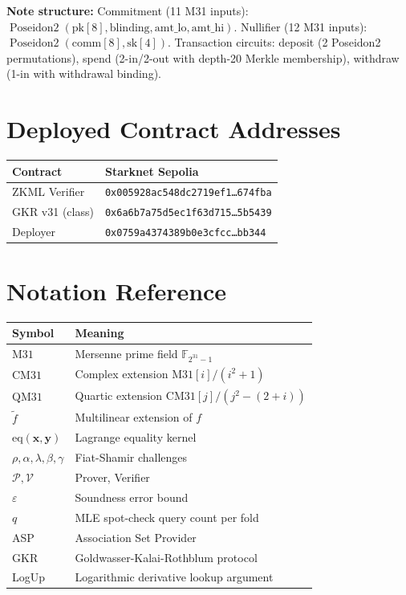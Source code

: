\documentclass[10pt,twocolumn]{article}
\theoremstyle{definition}
\theoremstyle{remark}
\newcommand{\F}{\mathbb{F}}
\newcommand{\M}{\mathrm{M31}}
\newcommand{\CM}{\mathrm{CM31}}
\newcommand{\QM}{\mathrm{QM31}}
\newcommand{\eq}{\mathrm{eq}}
\newcommand{\MLE}{\widetilde}
\newcommand{\calP}{\mathcal{P}}
\newcommand{\calV}{\mathcal{V}}
\DeclareMathOperator{\prhash}{Poseidon2}
\begin{document}
\textbf{Note structure:}
Commitment (11 M31 inputs): $\prhash(\text{pk}[8], \text{blinding},
\text{amt\_lo}, \text{amt\_hi})$.
Nullifier (12 M31 inputs): $\prhash(\text{comm}[8], \text{sk}[4])$.
Transaction circuits: deposit (2 Poseidon2 permutations),
spend (2-in/2-out with depth-20 Merkle membership),
withdraw (1-in with withdrawal binding).

\section{Deployed Contract Addresses}\label{app:contracts}

\begin{table}[h]
  \centering\small
  \begin{tabularx}{\columnwidth}{@{}lX@{}}
    \toprule
    \textbf{Contract} & \textbf{Starknet Sepolia} \\
    \midrule
    ZKML Verifier    & \texttt{0x005928ac548dc2719ef1\ldots 674fba} \\
    GKR v31 (class)  & \texttt{0x6a6b7a75d5ec1f63d715\ldots 5b5439} \\
    Deployer         & \texttt{0x0759a4374389b0e3cfcc\ldots bb344} \\
    \bottomrule
  \end{tabularx}
\end{table}

\section{Notation Reference}\label{app:notation}

\begin{table}[h]
  \centering\small
  \begin{tabularx}{\columnwidth}{@{}lX@{}}
    \toprule
    \textbf{Symbol} & \textbf{Meaning} \\
    \midrule
    $\M$   & Mersenne prime field $\F_{2^{31}-1}$ \\
    $\CM$  & Complex extension $\M[i]/(i^2+1)$ \\
    $\QM$  & Quartic extension $\CM[j]/(j^2-(2+i))$ \\
    $\MLE{f}$ & Multilinear extension of $f$ \\
    $\eq(\mathbf{x},\mathbf{y})$ & Lagrange equality kernel \\
    $\rho,\alpha,\lambda,\beta,\gamma$ & Fiat-Shamir challenges \\
    $\calP, \calV$ & Prover, Verifier \\
    $\varepsilon$ & Soundness error bound \\
    $q$ & MLE spot-check query count per fold \\
    ASP    & Association Set Provider \\
    GKR    & Goldwasser-Kalai-Rothblum protocol \\
    LogUp  & Logarithmic derivative lookup argument \\
    \bottomrule
  \end{tabularx}
\end{table}




\end{document}
